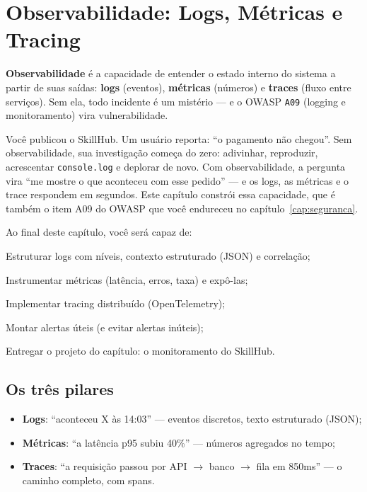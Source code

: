 \chapter{Observabilidade: Logs, Métricas e Tracing}
\label{cap:observabilidade}

\begin{caixaconceito}
\textbf{Observabilidade} é a capacidade de entender o estado interno do
sistema a partir de suas saídas: \textbf{logs} (eventos), \textbf{métricas}
(números) e \textbf{traces} (fluxo entre serviços). Sem ela, todo incidente é
um mistério — e o OWASP \texttt{A09} (logging e monitoramento) vira
vulnerabilidade.
\end{caixaconceito}

Você publicou o SkillHub. Um usuário reporta: ``o pagamento não chegou''.
Sem observabilidade, sua investigação começa do zero: adivinhar, reproduzir,
acrescentar \texttt{console.log} e deplorar de novo. Com observabilidade, a
pergunta vira ``me mostre o que aconteceu com esse pedido'' — e os logs, as
métricas e o trace respondem em segundos. Este capítulo constrói essa
capacidade, que é também o item A09 do OWASP que você endureceu no
capítulo~\ref{cap:seguranca}.

Ao final deste capítulo, você será capaz de:
\begin{objetivos}
  \item Estruturar logs com níveis, contexto estruturado (JSON) e correlação;
  \item Instrumentar métricas (latência, erros, taxa) e expô-las;
  \item Implementar tracing distribuído (OpenTelemetry);
  \item Montar alertas úteis (e evitar alertas inúteis);
  \item Entregar o projeto do capítulo: o monitoramento do SkillHub.
\end{objetivos}

\section{Os três pilares}

\begin{itemize}[leftmargin=*, itemsep=0.4em]
  \item \textbf{Logs}: ``aconteceu X às 14:03'' — eventos discretos, texto estruturado (JSON);
  \item \textbf{Métricas}: ``a latência p95 subiu 40\%'' — números agregados no tempo;
  \item \textbf{Traces}: ``a requisição passou por API $\rightarrow$ banco $\rightarrow$ fila em 850ms'' — o caminho completo, com spans.
\end{itemize}

